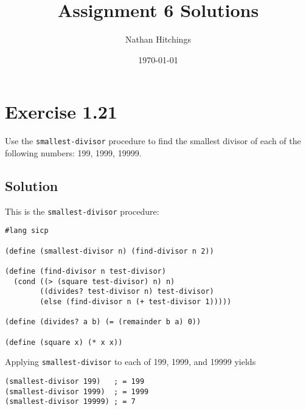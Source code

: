 \documentclass[11pt]{article}
\author{Nathan Hitchings}
\date{\today}
\title{Assignment 6 Solutions}
\begin{document}
\maketitle
\section{Exercise 1.21}
\label{sec:org5c12f83}
Use the \texttt{smallest-divisor} procedure to find the smallest divisor of each of
the following numbers: 199, 1999, 19999.
\subsection{Solution}
\label{sec:orga43f445}
This is the \texttt{smallest-divisor} procedure:
\begin{verbatim}
#lang sicp

(define (smallest-divisor n) (find-divisor n 2))

(define (find-divisor n test-divisor)
  (cond ((> (square test-divisor) n) n)
        ((divides? test-divisor n) test-divisor)
        (else (find-divisor n (+ test-divisor 1)))))

(define (divides? a b) (= (remainder b a) 0))

(define (square x) (* x x))
\end{verbatim}
Applying \texttt{smallest-divisor} to each of 199, 1999, and 19999 yields
\begin{verbatim}
(smallest-divisor 199)   ; = 199
(smallest-divisor 1999)  ; = 1999
(smallest-divisor 19999) ; = 7
\end{verbatim}
\end{document}
